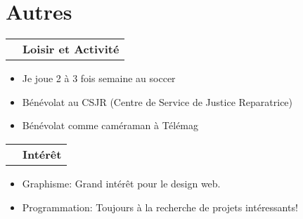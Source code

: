 \documentclass[a4paper,9pt]{extarticle}
\makeatletter
\newlength{\indicewidth}%
\newlength{\separatorcolumnwidth}%
\newlength{\maincolumnwidth}%
\newcommand{\indicestyle}[1]{\slshape\textcolor{color0}{#1}}
\def\middleline{
\raisebox{0.35em}{\line(1,0){50}}
}
\renewcommand{\subsection}[1]{
\par\addvspace{3ex}
\begin{tabular}{@{}p{\indicewidth}@{\hspace{\separatorcolumnwidth}}p{\maincolumnwidth}@{}}%
    \raggedleft\indicestyle{}\middleline & { \strut\bfseries {#1} }%
    \par
\end{tabular}%
\vspace{-0.5em}
}
\makeatother
\begin{document}
\section{Autres}
\subsection{Loisir et Activité}
\begin{itemize}

\item Je joue 2 à 3 fois semaine au soccer
\item Bénévolat au CSJR (Centre de Service de Justice Reparatrice)
\item Bénévolat comme caméraman à Télémag
\end{itemize}
\subsection{Intérêt}
\begin{itemize}
\item Graphisme: Grand intérêt pour le design web.
\item Programmation: Toujours à la recherche de projets intéressants!
\end{itemize}
\end{document}
